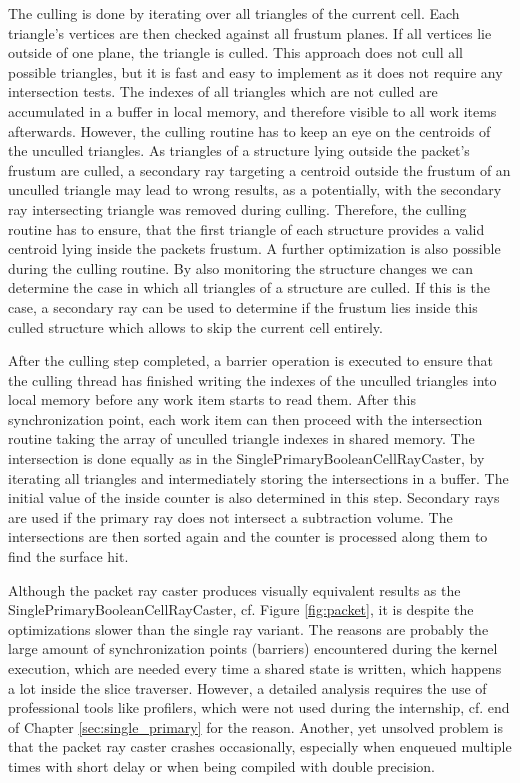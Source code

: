 The culling is done by iterating over all triangles of the current cell. Each triangle's vertices are then checked against all frustum planes. If all vertices lie outside of one plane, the triangle is culled. This approach does not cull all possible triangles, but it is fast and easy to implement as it does not require any intersection tests. The indexes of all triangles which are not culled are accumulated in a buffer in local memory, and therefore visible to all work items afterwards. However, the culling routine has to keep an eye on the centroids of the unculled triangles. As triangles of a structure lying outside the packet's frustum are culled, a secondary ray targeting a centroid outside the frustum of an unculled triangle may lead to wrong results, as a potentially, with the secondary ray intersecting triangle was removed during culling. Therefore, the culling routine has to ensure, that the first triangle of each structure provides a valid centroid lying inside the packets frustum.
A further optimization is also possible during the culling routine. By also monitoring the structure changes we can determine the case in which all triangles of a structure are culled. If this is the case, a secondary ray can be used to determine if the frustum lies inside this culled structure which allows to skip the current cell entirely.

After the culling step completed, a barrier operation is executed to ensure that the culling thread has finished writing the indexes of the unculled triangles into local memory before any work item starts to read them. After this synchronization point, each work item can then proceed with the intersection routine taking the array of unculled triangle indexes in shared memory. The intersection is done equally as in the SinglePrimaryBooleanCellRayCaster, by iterating all triangles and intermediately storing the intersections in a buffer. The initial value of the inside counter is also determined in this step. Secondary rays are used if the primary ray does not intersect a subtraction volume. The intersections are then sorted again and the counter is processed along them to find the surface hit.

Although the packet ray caster produces visually equivalent results as the SinglePrimaryBooleanCellRayCaster, cf. Figure \ref{fig:packet}, it is despite the optimizations slower than the single ray variant. The reasons are probably the large amount of synchronization points (barriers) encountered during the kernel execution, which are needed every time a shared state is written, which happens a lot inside the slice traverser. However, a detailed analysis requires the use of professional tools like profilers, which were not used during the internship, cf. end of Chapter \ref{sec:single_primary} for the reason. Another, yet unsolved problem is that the packet ray caster crashes occasionally, especially when enqueued multiple times with short delay or when being compiled with double precision. 


